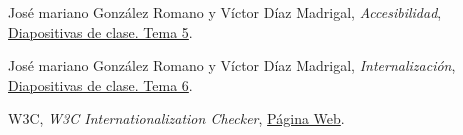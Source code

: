 \documentclass[a4paper,11pt]{article}
\begin{document}
\begin{thebibliography}{99}
José mariano González Romano y Víctor Díaz Madrigal,
\textit{Accesibilidad},
\href{https://s3-eu-central-1.amazonaws.com/learn-eu-central-1-prod-fleet01-xythos/5ac734ed505df/2113026?response-content-disposition=inline%3B%20filename%2A%3DUTF-8%27%27IPO-2018-19-05-Accesibilidad.pdf&response-content-type=application%2Fpdf&X-Amz-Algorithm=AWS4-HMAC-SHA256&X-Amz-Date=20181204T121814Z&X-Amz-SignedHeaders=host&X-Amz-Expires=21600&X-Amz-Credential=AKIAIZ3QX2YUHH4EOO3A%2F20181204%2Feu-central-1%2Fs3%2Faws4_request&X-Amz-Signature=c47e51bae64476cffa8186f4f4bb7c40257eac45d1f2a68b63e6b66dbc5a1609}{Diapositivas de clase. Tema 5}.

José mariano González Romano y Víctor Díaz Madrigal,
\textit{Internalización},
\href{https://s3-eu-central-1.amazonaws.com/learn-eu-central-1-prod-fleet01-xythos/5ac734ed505df/2214811?response-content-disposition=inline%3B%20filename%2A%3DUTF-8%27%27IPO-2018-19-06-Internacionalizaci%25C3%25B3n.pdf&response-content-type=application%2Fpdf&X-Amz-Algorithm=AWS4-HMAC-SHA256&X-Amz-Date=20181204T121848Z&X-Amz-SignedHeaders=host&X-Amz-Expires=21600&X-Amz-Credential=AKIAIZ3QX2YUHH4EOO3A%2F20181204%2Feu-central-1%2Fs3%2Faws4_request&X-Amz-Signature=e7b08ac13f1e9819a1a8f39938e1176631bfe0cf869f6b30b0e687b6a0efa442}{Diapositivas de clase. Tema 6}.

W3C,
\textit{W3C Internationalization Checker},
\href{http://validator.w3.org/i18n-checker/}{Página Web}.




\end{thebibliography}
\end{document}
